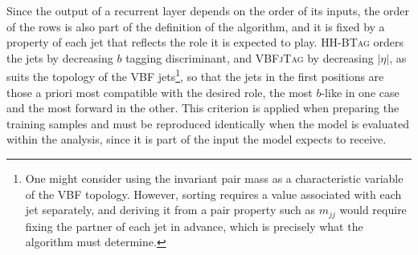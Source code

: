 Since the output of a recurrent layer depends on the order of its inputs, the order of the rows is also part of the definition of the algorithm, and it is fixed by a property of each jet that reflects the role it is expected to play. \textsc{HH-BTag} orders the jets by decreasing $b$ tagging discriminant, and \textsc{VBFjTag} by decreasing $|\eta|$, as suits the topology of the VBF jets\footnote{One might consider using the invariant pair mass as a characteristic variable of the VBF topology. However, sorting requires a value associated with each jet separately, and deriving it from a pair property such as $m_{jj}$ would require fixing the partner of each jet in advance, which is precisely what the algorithm must determine.}, so that the jets in the first positions are those a priori most compatible with the desired role, the most $b$-like in one case and the most forward in the other. This criterion is applied when preparing the training samples and must be reproduced identically when the model is evaluated within the analysis, since it is part of the input the model expects to receive.

